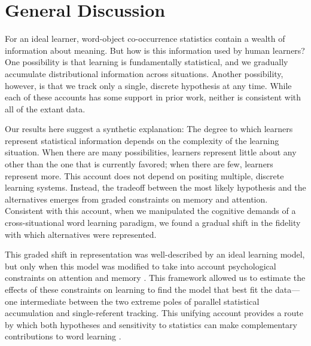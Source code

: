 \documentclass[man,floatsintext]{apa6}
\begin{document}
\section{General Discussion}

For an ideal learner, word-object co-occurrence statistics contain a wealth of information about meaning. But how is this information used by human learners? One possibility is that learning is fundamentally statistical, and we gradually accumulate distributional information across situations. Another possibility, however, is that we track only a single, discrete hypothesis at any time. While each of these accounts has some support in prior work, neither is consistent with all of the extant data.

Our results here suggest a synthetic explanation: The degree to which learners represent statistical information depends on the complexity of the learning situation. When there are many possibilities, learners represent little about any other than the one that is currently favored; when there are few, learners represent more. This account does not depend on positing multiple, discrete learning systems. Instead, the tradeoff between the most likely hypothesis and the alternatives emerges from graded constraints on memory and attention. Consistent with this account, when we manipulated the cognitive demands of a cross-situational word learning paradigm, we found a gradual shift in the fidelity with which alternatives were represented.

This graded shift in representation was well-described by an ideal learning model, but only when this model was modified to take into account psychological constraints on attention and memory \cite{Kachergis2012,Vlach2013,Yurovsky2014}. This framework allowed us to estimate the effects of these constraints on learning to find the model that best fit the data---one intermediate between the two extreme poles of parallel statistical accumulation and single-referent tracking. This unifying account provides a route by which both hypotheses and sensitivity to statistics can make complementary contributions to word learning \cite{Waxman2009,Kachergis2013}. 
\end{document}

